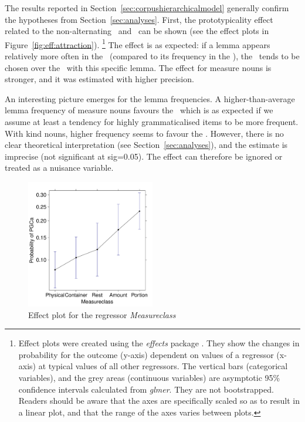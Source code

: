 The results reported in Section~\ref{sec:corpushierarchicalmodel} generally confirm the hypotheses from Section~\ref{sec:analyses}.
First, the prototypicality effect related to the non-alternating \PGCd\ and \NACb\ can be shown (see the effect plots in Figure~\ref{fig:eff:attraction}).%
\footnote{Effect plots were created using the \textit{effects} package \citep{Fox2003}.
They show the changes in probability for the outcome (y-axis) dependent on values of a regressor (x-axis) at typical values of all other regressors.
The vertical bars (categorical variables), and the grey areas (continuous variables) are asymptotic 95\% confidence intervals calculated from \textit{glmer}.
They are not bootstrapped.
Readers should be aware that the axes are specifically scaled so as to result in a linear plot, and that the range of the axes varies between plots.}
The effect is as expected:
if a lemma appears relatively more often in the \PGCd\ (compared to its frequency in the \NACb), the \PGCa\ tends to be chosen over the \NACa\ with this specific lemma.
The effect for measure nouns is stronger, and it was estimated with higher precision.

An interesting picture emerges for the lemma frequencies.
A higher-than-average lemma frequency of measure nouns favours the \NACa\, which is as expected if we assume at least a tendency for highly grammaticalised items to be more frequent.
With kind nouns, higher frequency seems to favour the \PGCa.
However, there is no clear theoretical interpretation (see Section~\ref{sec:analyses}), and the estimate is imprecise (not significant at sig=0.05).
The effect can therefore be ignored or treated as a nuisance variable.


\begin{figure}[h!]
  \centering
  \includegraphics[width=0.5\textwidth]{../R/output/corpus_Measureclass}
  \caption{Effect plot for the regressor \textit{Measureclass}}
  \label{fig:eff:measureattraction}
\end{figure}

